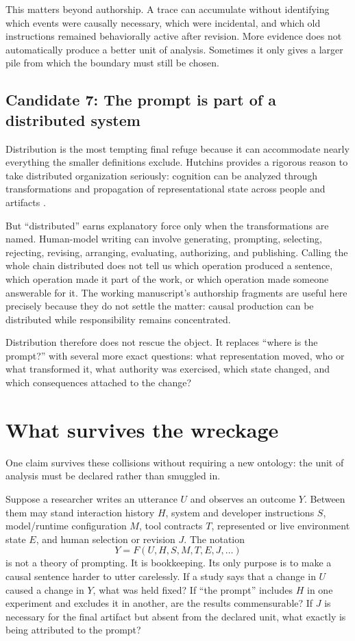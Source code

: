 \documentclass[11pt]{article}
\newcommand{\candidate}[1]{\subsection*{Candidate #1}}
\begin{document}
This matters beyond authorship. A trace can accumulate without identifying which events were causally necessary, which were incidental, and which old instructions remained behaviorally active after revision. More evidence does not automatically produce a better unit of analysis. Sometimes it only gives a larger pile from which the boundary must still be chosen.

\candidate{7: The prompt is part of a distributed system}
Distribution is the most tempting final refuge because it can accommodate nearly everything the smaller definitions exclude. Hutchins provides a rigorous reason to take distributed organization seriously: cognition can be analyzed through transformations and propagation of representational state across people and artifacts \parencite{hutchins1995cognition}.

But “distributed” earns explanatory force only when the transformations are named. Human-model writing can involve generating, prompting, selecting, rejecting, revising, arranging, evaluating, authorizing, and publishing. Calling the whole chain distributed does not tell us which operation produced a sentence, which operation made it part of the work, or which operation made someone answerable for it. The working manuscript’s authorship fragments are useful here precisely because they do not settle the matter: causal production can be distributed while responsibility remains concentrated.

Distribution therefore does not rescue the object. It replaces “where is the prompt?” with several more exact questions: what representation moved, who or what transformed it, what authority was exercised, which state changed, and which consequences attached to the change?

\section{What survives the wreckage}
One claim survives these collisions without requiring a new ontology: the unit of analysis must be declared rather than smuggled in.

Suppose a researcher writes an utterance $U$ and observes an outcome $Y$. Between them may stand interaction history $H$, system and developer instructions $S$, model/runtime configuration $M$, tool contracts $T$, represented or live environment state $E$, and human selection or revision $J$. The notation
\[
Y = F(U,H,S,M,T,E,J,\ldots)
\]
is not a theory of prompting. It is bookkeeping. Its only purpose is to make a causal sentence harder to utter carelessly. If a study says that a change in $U$ caused a change in $Y$, what was held fixed? If “the prompt” includes $H$ in one experiment and excludes it in another, are the results commensurable? If $J$ is necessary for the final artifact but absent from the declared unit, what exactly is being attributed to the prompt?
\end{document}
